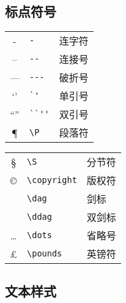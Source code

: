 \documentclass{ctexbook}
\begin{document}
\subsection{标点符号}

\begin{table}[h!]
	\centering
	\begin{minipage}[t]{0.46\textwidth}
		\centering
		\begin{tabular}{c p{7em} p{5em}}
			\hline
			-          & \verb|-|          & 连字符 \\
			--         & \verb|--|         & 连接号 \\
			---        & \verb|---|        & 破折号 \\
			`'         & \verb|`'|         & 单引号 \\
			``''       & \verb|``''|       & 双引号 \\
			\P         & \verb|\P|         & 段落符 \\
			\hline
		\end{tabular}
	\end{minipage}
	\qquad
	\begin{minipage}[t]{0.46\textwidth}
		\centering
		\begin{tabular}{c p{7em} p{5em}}
			\hline
			\S         & \verb|\S|         & 分节符 \\
			\copyright & \verb|\copyright| & 版权符 \\
			\dag       & \verb|\dag|       & 剑标 \\
			\ddag      & \verb|\ddag|      & 双剑标 \\
			\dots      & \verb|\dots|      & 省略号 \\
			\pounds    & \verb|\pounds|    & 英镑符 \\
			\hline
		\end{tabular}
	\end{minipage}
\end{table}

\newpage
\subsection{文本样式}
\end{document}
